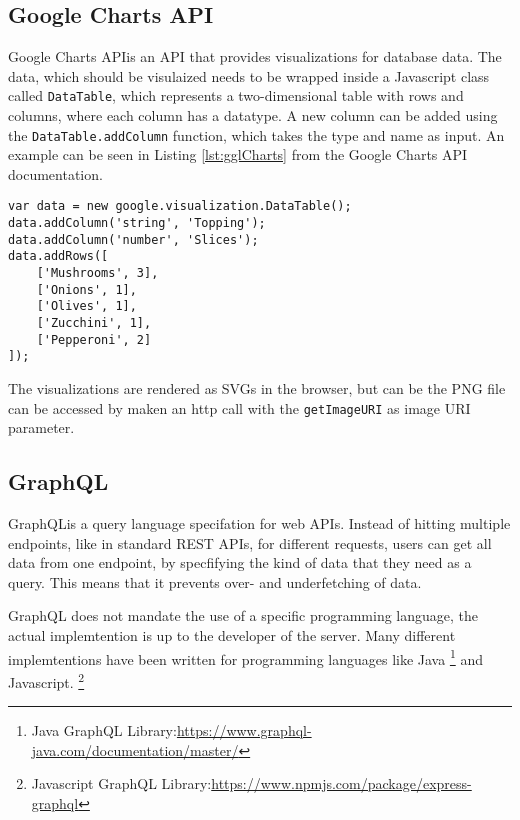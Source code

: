 \subsection{Google Charts API}
Google Charts API\footnotemark is an API that provides visualizations for database data. The data, which should be visulaized needs to be wrapped inside a Javascript class called \texttt{DataTable}, which represents a two-dimensional table with rows and columns, where each column has a datatype.
A new column can be added using the \texttt{DataTable.addColumn} function, which takes the type and name as input. An example can be seen in Listing \ref{lst:gglCharts} from the Google Charts API documentation\footnotemark[\value{footnote}].

\begin{lstlisting}[caption=Example use of the DataTable class,captionpos=b,label={lst:gglCharts}]
var data = new google.visualization.DataTable();
data.addColumn('string', 'Topping');
data.addColumn('number', 'Slices');
data.addRows([
	['Mushrooms', 3],
	['Onions', 1],
	['Olives', 1], 
	['Zucchini', 1],
	['Pepperoni', 2]
]);
\end{lstlisting}

The visualizations are rendered as SVGs in the browser, but can be the PNG file can be accessed by maken an http call with the \texttt{getImageURI} as image URI parameter.


\subsection{GraphQL}
GraphQL\footnotemark is a query language specifation for web APIs.
Instead of hitting multiple endpoints, like in standard REST APIs, for different requests, users can get all data from one endpoint, by specfifying the kind of data that they need as a query. This means that it prevents over- and underfetching of data.\footnotemark


GraphQL does not mandate the use of a specific programming language, the actual implemtention is up to the developer of the server. \footnotemark
{}
Many different implemtentions have been written for programming languages like Java \footnote{Java GraphQL Library:\href{https://www.graphql-java.com/documentation/master/}{https://www.graphql-java.com/documentation/master/}} and Javascript. \footnote{Javascript GraphQL Library:\href{https://www.npmjs.com/package/express-graphql}{https://www.npmjs.com/package/express-graphql}}


